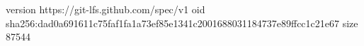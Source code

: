 version https://git-lfs.github.com/spec/v1
oid sha256:dad0a691611c75faf1fa1a73ef85e1341c2001688031184737e89ffcc1c21e67
size 87544
